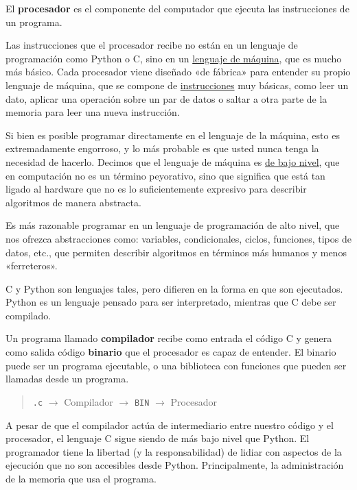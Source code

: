 El \textbf{procesador} es el componente del computador que ejecuta las
instrucciones de un programa.

Las instrucciones que el procesador recibe no están en un lenguaje de
programación como Python o C, sino en un
\href{http://en.wikipedia.org/wiki/Machine\_code}{lenguaje de máquina},
que es mucho más básico. Cada procesador viene diseñado «de fábrica»
para entender su propio lenguaje de máquina, que se compone de
\href{http://en.wikipedia.org/wiki/Instruction\_set}{instrucciones} muy
básicas, como leer un dato, aplicar una operación sobre un par de datos
o saltar a otra parte de la memoria para leer una nueva instrucción.

Si bien es posible programar directamente en el lenguaje de la máquina,
esto es extremadamente engorroso, y lo más probable es que usted nunca
tenga la necesidad de hacerlo. Decimos que el lenguaje de máquina es
\href{http://en.wikipedia.org/wiki/Low-level\_programming\_language}{de
bajo nivel}, que en computación no es un término peyorativo, sino que
significa que está tan ligado al hardware que no es lo suficientemente
expresivo para describir algoritmos de manera abstracta.

Es más razonable programar en un lenguaje de programación de alto nivel,
que nos ofrezca abstracciones como: variables, condicionales, ciclos,
funciones, tipos de datos, etc., que permiten describir algoritmos en
términos más humanos y menos «ferreteros».

C y Python son lenguajes tales, pero difieren en la forma en que son
ejecutados. Python es un lenguaje pensado para ser interpretado,
mientras que C debe ser compilado.

Un programa llamado \textbf{compilador} recibe como entrada el código C
y genera como salida código \textbf{binario} que el procesador es capaz
de entender. El binario puede ser un programa ejecutable, o una
biblioteca con funciones que pueden ser llamadas desde un programa.

\begin{quote}
  \texttt{.c}
  \(\to\)
  Compilador
  \(\to\)
  \texttt{BIN}
  \(\to\)
  Procesador
\end{quote}

A pesar de que el compilador actúa de intermediario entre nuestro código
y el procesador, el lenguaje C sigue siendo de más bajo nivel que
Python. El programador tiene la libertad (y la responsabilidad) de
lidiar con aspectos de la ejecución que no son accesibles desde Python.
Principalmente, la administración de la memoria que usa el programa.

